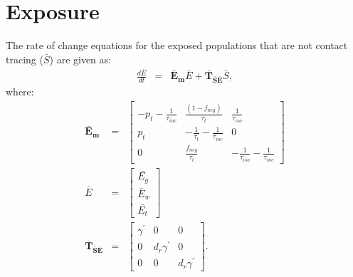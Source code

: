 \documentclass[notitlepage, superscriptaddress]{revtex4-2}
\begin{document}
\section{Exposure}
The rate of change equations for the exposed populations that are not contact tracing ($\bar{S}$) are given as:
\begin{eqnarray}
\frac{d\bar{E}}{dt} &=& \boldsymbol{\bar{E}_{m}}  \bar{E} + \boldsymbol{\bar{T}_{\bar{S}\bar{E}}}  \bar{S}, 
\end{eqnarray}
where:
\begin{eqnarray}
\boldsymbol{\bar{E}_{m}} &=&
\begin{bmatrix}
 - p_{t} -\frac{1}{\tau_{inc}}  &  \frac{(1-f_{neg})}{\tau_{t}}             & \frac{1}{\tau_{iso}} \\ 
 p_{t}              & -\frac{1}{\tau_{t}} -\frac{1}{\tau_{inc}}  & 0  \\ 
 0                  & \frac{f_{neg}}{\tau_{t}}                  & -\frac{1}{\tau_{iso}} -\frac{1}{\tau_{inc}}
\end{bmatrix} \\ 
%
\bar{E} &=& 
\begin{bmatrix}
\bar{E_{g}} \\ \bar{E}_{w}\\ \bar{E_{t}}
\end{bmatrix} \\
%
\boldsymbol{\bar{T}_{\bar{S}\bar{E}}} &=& 
    \begin{bmatrix}
\gamma^{'}  & 0                 & 0 \\ 
 0          & d_{r} \gamma^{'}  & 0 \\ 
 0          & 0                 & d_{r} \gamma^{'} 
\end{bmatrix}.
%
\end{eqnarray}
\end{document}
